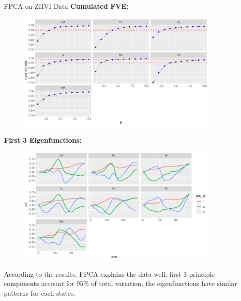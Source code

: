 \documentclass[final]{beamer}
\newlength{\colwidth}
\begin{document}
\begin{frame}[t]
\begin{columns}[t]
\begin{column}{\colwidth}
\begin{block}{FPCA on ZHVI Data}
\textbf{Cumulated FVE:}
 \vspace{-0.5em}
 \begin{figure}[h]
\includegraphics[width=0.9\textwidth]{figure/FVE.pdf}
\end{figure}

  \vspace{-1em}
  
\textbf{First 3 Eigenfunctions:}
  \vspace{-0.5em}
 \begin{figure}[h]
\includegraphics[width=0.9\textwidth]{figure/eig_funcs.pdf}
\end{figure}

 \vspace{-1.1em}
According to the results, FPCA explains the data well, first 3 principle components account for $95\%$ of total variation, 
the eigenfunctions have similar patterns for each states.

  \end{block}



\end{column}




\end{columns}
\end{frame}
\end{document}

